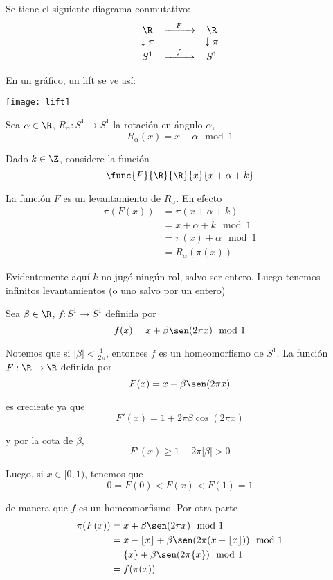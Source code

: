 \documentclass[	docname= Sistemas\ Din\'amicos,
				finished=1,
				semester=1,
				year=2017,
				professor=Godofredo\ Iommi,
				sigla=MAT2565]{apunte}
\begin{document}
\begin{obsd} Se tiene el siguiente diagrama conmutativo:
	$$\begin{array}{ccc}
		\R			&	\xrightarrow{\quad F \quad}	&	\R	\\
		\downarrow \pi	&							&	\downarrow \pi	\\
		S^{1}		&	\xrightarrow{\quad f \quad}	&	S^{1}
	\end{array}$$
\end{obsd}

En un gráfico, un lift se ve así:
	\begin{center}
		\texttt{[image: lift]}
	\end{center}

\begin{ex} Sea $\alpha \in \R$, $R_{\alpha}: S^{1} \to S^{1}$ la rotación en ángulo $\alpha$,
	$$R_{\alpha}(x) = x+\alpha \mod 1$$

Dado $k \in \Z$, considere la función
	$$\func{F}{\R}{\R}
			{x}{x + \alpha + k}$$
		
La función $F$ es un levantamiento de $R_{\alpha}$. En efecto
	\begin{align*}
		\pi(F(x))
			&=	\pi(x + \alpha + k)	\\
			&=	x + \alpha + k \mod 1	\\
			&=	\pi(x) + \alpha \mod 1	\\
			&=	R_{\alpha}(\pi(x))
	\end{align*}

Evidentemente aquí $k$ no jugó ningún rol, salvo ser entero. Luego tenemos infinitos levantamientos (o uno salvo por un entero)
\end{ex}

\begin{ex} Sea $\beta \in \R$, $f: S^{1} \to S^{1}$ definida por
	$$f(x) = x +  \beta \sen (2\pi x) \mod 1$$

Notemos que si $|\beta| < \frac{1}{2\pi}$, entonces $f$ es un homeomorfismo de $S^{1}$. La función $F: \R \to \R$ definida por
	$$F(x) = x + \beta \sen (2\pi x)$$

es creciente ya que
	$$F'(x) = 1 + 2\pi \beta \cos (2\pi x) $$
	
y por la cota de $\beta$,
	$$F'(x) \geq 1 - 2\pi |\beta| > 0$$

Luego, si $x \in [0,1)$, tenemos que 
	$$0 = F(0) < F(x) < F(1) = 1$$

de manera que $f$ es un homeomorfismo. Por otra parte
	\begin{align*}
		\pi(F(x))
			&=	x + \beta \sen (2\pi x) \mod 1	\\
			&=	x - \lfloor x \rfloor + \beta \sen(2\pi (x - \lfloor x \rfloor)) \mod 1	\\
			&=	\{x\} + \beta \sen(2\pi\{x\}) \mod 1	\\
			&=	f(\pi(x))
	\end{align*}
\end{ex}
\end{document}
